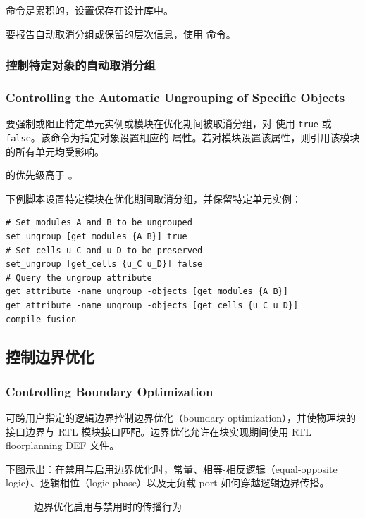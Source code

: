  命令是累积的，设置保存在设计库中。

要报告自动取消分组或保留的层次信息，使用  命令。

\subsubsection{控制特定对象的自动取消分组}
\subsubsection*{Controlling the Automatic Ungrouping of Specific Objects}

要强制或阻止特定单元实例或模块在优化期间被取消分组，对  使用 \texttt{true} 或 \texttt{false}。该命令为指定对象设置相应的  属性。若对模块设置该属性，则引用该模块的所有单元均受影响。

\begin{noteBox}
 的优先级高于 。
\end{noteBox}

下例脚本设置特定模块在优化期间取消分组，并保留特定单元实例：
\begin{lstlisting}
# Set modules A and B to be ungrouped
set_ungroup [get_modules {A B}] true
# Set cells u_C and u_D to be preserved
set_ungroup [get_cells {u_C u_D}] false
# Query the ungroup attribute
get_attribute -name ungroup -objects [get_modules {A B}]
get_attribute -name ungroup -objects [get_cells {u_C u_D}]
compile_fusion
\end{lstlisting}

\subsection{控制边界优化}
\subsubsection*{Controlling Boundary Optimization}

可跨用户指定的逻辑边界控制边界优化（boundary optimization），并使物理块的接口边界与 RTL 模块接口匹配。边界优化允许在块实现期间使用 RTL floorplanning DEF 文件。

下图示出：在禁用与启用边界优化时，常量、相等-相反逻辑（equal-opposite logic）、逻辑相位（logic phase）以及无负载 port 如何穿越逻辑边界传播。

\begin{figure}[htbp]
\centering
{}
\caption{边界优化启用与禁用时的传播行为}
\label{fig:boundary-opt-prop}
\end{figure}

